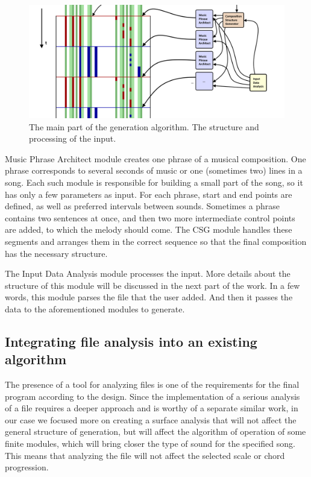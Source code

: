 \documentclass[thesis=B,english]{FITthesis}[2019/12/23]
\begin{document}
\begin{figure}[ht]
            \includegraphics[width=\textwidth]{Theory5.png}
            \caption[The main part of the generation algorithm]{The main part of the generation algorithm. The structure and processing of the input.}
            \label{fig:Theory5}
\end{figure}

Music Phrase Architect module creates one phrase of a musical composition. One phrase corresponds to several seconds of music or one (sometimes two) lines in a song. Each such module is responsible for building a small part of the song, so it has only a few parameters as input. For each phrase, start and end points are defined, as well as preferred intervals between sounds. Sometimes a phrase contains two sentences at once, and then two more intermediate control points are added, to which the melody should come. The CSG module handles these segments and arranges them in the correct sequence so that the final composition has the necessary structure.

The Input Data Analysis module processes the input. More details about the structure of this module will be discussed in the next part of the work. In a few words, this module parses the file that the user added. And then it passes the data to the aforementioned modules to generate.

\subsection{Integrating file analysis into an existing algorithm}

The presence of a tool for analyzing files is one of the requirements for the final program according to the design. Since the implementation of a serious analysis of a file requires a deeper approach and is worthy of a separate similar work, in our case we focused more on creating a surface analysis that will not affect the general structure of generation, but will affect the algorithm of operation of some finite modules, which will bring closer the type of sound for the specified song. This means that analyzing the file will not affect the selected scale or chord progression.
\end{document}
